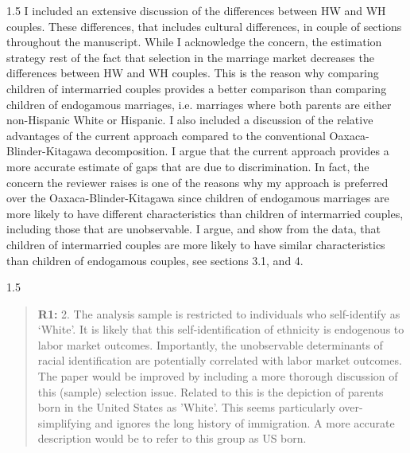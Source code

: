 \documentclass[12pt,english]{article}
\newcommand{\rrxspc}{1.5}
\begin{document}
\begin{refsection}
    \begin{spacing}{\rrxspc}
        I included an extensive discussion of the differences between HW and WH couples. These differences, that includes cultural differences, in couple of sections throughout the manuscript. While I acknowledge the concern, the estimation strategy rest of the fact that selection in the marriage market decreases the differences between HW and WH couples. This is the reason why comparing children of intermarried couples provides a better comparison than comparing children of endogamous marriages, i.e. marriages where both parents are either non-Hispanic White or Hispanic. I also included a discussion of the relative advantages of the current approach compared to the conventional Oaxaca-Blinder-Kitagawa decomposition. I argue that the current approach provides a more accurate estimate of gaps that are due to discrimination. In fact, the concern the reviewer raises is one of the reasons why my approach is preferred over the Oaxaca-Blinder-Kitagawa since children of endogamous marriages are more likely to have different characteristics than children of intermarried couples, including those that are unobservable. I argue, and show from the data, that children of intermarried couples are more likely to have similar characteristics than children of endogamous couples, see sections 3.1, and 4.
    \end{spacing}
    
    \begin{spacing}{\rrxspc}
    \begin{quotation}
        \textbf{R1: } 2. The analysis sample is restricted to individuals who self-identify as ‘White’. It is likely that this self-identification of ethnicity is endogenous to labor market outcomes. Importantly, the unobservable determinants of racial identification are potentially correlated with labor market outcomes. The paper would be improved by including a more thorough discussion of this (sample) selection issue. Related to this is the depiction of parents born in the United States as ’White’. This seems particularly over-simplifying and ignores the long history of immigration. A more accurate description would be to refer to this group as US born.
        \end{quotation}
        \end{spacing}
        

\end{refsection}
\end{document}
